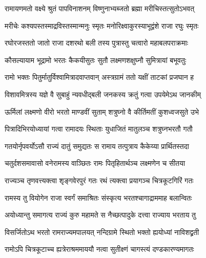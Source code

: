 

\textlink{}
\translink{}

\storymeta



\twolineshloka
{रामायणमतो वक्ष्ये श्रुतं पापविनाशनम्}
{विष्णुनाभ्यब्जतो ब्रह्मा मरीचिस्तत्सुतोऽभवत्} %

\twolineshloka
{मरीचेः कश्यपस्तस्माद्रविस्तस्मान्मनुः स्मृतः}
{मनोरिक्ष्वाकुरस्याभूद्वंशे राजा रघुः स्मृतः} %

\twolineshloka
{रघोरजस्ततो जातो राजा दशरथो बली}
{तस्य पुत्रास्तु चत्वारो महाबलपराक्रमाः} %

\twolineshloka
{कौसल्यायाम भूद्रामो भरतः कैकयीसुतः}
{सुतौ लक्ष्मणशक्षुघ्नौ सुमित्रायां बभूवतुः} %

\twolineshloka
{रामो भक्तः पितुर्मातुर्विश्वामित्रादवाप्तवान्}
{अस्त्रग्रामं ततो यक्षीं ताटकां प्रजघान ह} %

\twolineshloka
{विशावमित्रस्य यज्ञे वै सुबाहुं न्यवधीद्बली}
{जनकस्य क्रतुं गत्वा उपयेमेऽथ जानकीम्} %

\twolineshloka
{ऊर्मिलां लक्ष्मणो वीरो भरतो माण्डवीं सुताम्}
{शत्रुघ्नो वै कीर्तिमतीं कुशध्वजसुते उभे} %

\twolineshloka
{पित्रादिभिरयोध्यायां गत्वा रामादयः स्थिताः}
{युधाजितं मातुलञ्च शत्रुघ्नभरतौ गतौ} %

\twolineshloka
{गतयोर्नृपवर्योऽसौ राज्यं दातुं समुद्यतः}
{स रामाय तत्पुत्राय कैकेय्या प्रार्थितस्तदा} %

\twolineshloka
{चतुर्दशसमावासो वनेरामस्य वाञ्छितः}
{रामः पितृहितार्थञ्च लक्ष्मणेन च सीतया} %

\twolineshloka
{राज्यञ्च तृणवत्त्यक्त्वा शृङ्गवेरपुरं गतः}
{रथं त्यक्त्वा प्रयागञ्च चित्रकूटगिरिं गतः} %

\twolineshloka
{रामस्य तु वियोगेन राजा स्वर्गं समाश्रितः}
{संस्कृत्य भरतश्चागाद्राममाह बलान्वितः} %

\twolineshloka
{अयोध्यान्तु समागत्य राज्यं कुरु महामते}
{स नैच्छत्पादुके दत्त्वा राज्याय भरताय तु} %

\twolineshloka
{विसर्जितोऽथ भरतो रामराज्यमपालयत्}
{नन्दिग्रामे स्थितो भक्तो ह्ययोध्यां नाविशद्व्रती} %

\twolineshloka
{रामोऽपि चित्रकूटाच्च ह्यत्रेराश्रममाययौ}
{नत्वा सुतीक्ष्णं चागस्त्यं दण्डकारण्यमागतः} %


